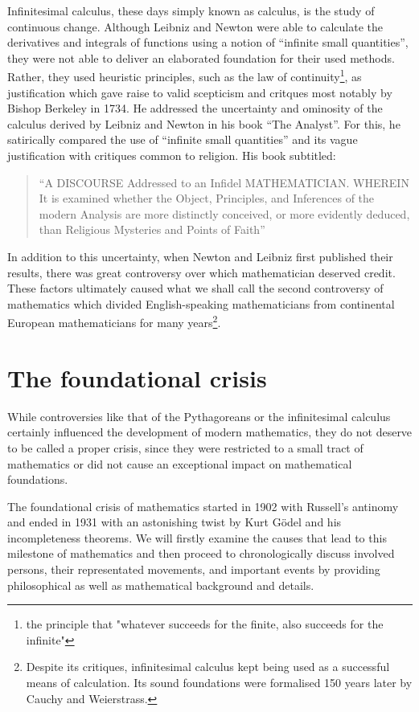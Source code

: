 \documentclass[hidelinks]{article}
\theoremstyle{plain}
\theoremstyle{definition}
\theoremstyle{rem}
\begin{document}
Infinitesimal calculus, these days simply known as calculus, is the study of continuous change. Although Leibniz and Newton were able to calculate the derivatives and integrals of functions using a notion of ``infinite small quantities'', they were not able to deliver an elaborated foundation for their used methods. Rather, they used heuristic principles, such as the law of continuity\footnote{the principle that "whatever succeeds for the finite, also succeeds for the infinite"}, as justification which gave raise to valid scepticism and critques most notably by Bishop Berkeley in 1734. He addressed the uncertainty and ominosity of the calculus derived by Leibniz and Newton in his book ``The Analyst''. For this, he satirically compared the use of ``infinite small quantities'' and its vague justification with critiques common to religion. His book subtitled:
\begin{quote}
	``A DISCOURSE Addressed to an Infidel MATHEMATICIAN\@. WHEREIN It is examined whether the Object, Principles, and Inferences of the modern Analysis are more distinctly conceived, or more evidently deduced, than Religious Mysteries and Points of Faith''
\end{quote}
In addition to this uncertainty, when Newton and Leibniz first published their results, there was great controversy over which mathematician deserved credit. These factors ultimately caused what we shall call the second controversy of mathematics which divided English-speaking mathematicians from continental European mathematicians for many years\footnote{Despite its critiques, infinitesimal calculus kept being used as a successful means of calculation. Its sound foundations were formalised 150 years later by Cauchy and Weierstrass.}.

\section{The foundational crisis}
While controversies like that of the Pythagoreans or the infinitesimal calculus certainly influenced the development of modern mathematics, they do not deserve to be called a proper crisis, since they were restricted to a small tract of mathematics or did not cause an exceptional impact on mathematical foundations.

The foundational crisis of mathematics started in 1902 with Russell's antinomy and ended in 1931 with an astonishing twist by Kurt Gödel and his incompleteness theorems.
We will firstly examine the causes that lead to this milestone of mathematics and then proceed to chronologically discuss involved persons, their representated movements, and important events by providing philosophical as well as mathematical background and details.
\end{document}
